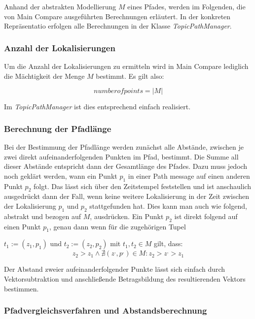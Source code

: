 Anhand der abstrakten Modellierung $M$ eines Pfades, werden im Folgenden, die von
Main Compare ausgeführten Berechnungen erläutert. In der konkreten
Repräsentatio erfolgen alle Berechnungen in der Klasse \textit{TopicPathManager}. 

\subsubsection{Anzahl der Lokalisierungen}
Um die Anzahl der Lokalisierungen zu ermitteln wird in Main Compare lediglich die
Mächtigkeit der Menge $M$ bestimmt. Es gilt also:

\begin{equation*}
  \label{eqn:numofpoints}
  number of points = \vert M \vert
\end{equation*}

Im \textit{TopicPathManager} ist dies entsprechend einfach realisiert.

\subsubsection{Berechnung der Pfadlänge}
Bei der Bestimmung der Pfadlänge werden zunächst alle Abstände, zwischen je
zwei direkt aufeinanderfolgenden Punkten im Pfad, bestimmt. Die Summe all dieser
Abstände entspricht dann der Gesamtlänge des Pfades. Dazu muss jedoch noch
geklärt werden, wann ein Punkt $p_1$ in einer Path message auf einen anderen
Punkt $p_2$ folgt. Das lässt sich über den Zeitstempel feststellen und ist
anschaulich ausgedrückt dann der Fall, wenn keine weitere Lokalisierung in
der Zeit zwischen der Lokalisierung $p_1$ und $p_2$ stattgefunden hat. Dies kann man auch wie
folgend, abstrakt und bezogen auf $M$, ausdrücken.  Ein Punkt $p_2$ ist direkt
folgend auf einen Punkt $p_1$, genau dann wenn für die zugehörigen Tupel

$t_1 := (z_1, p_1)$ und $t_2 := (z_2, p_2)$
mit
$t_1,t_2 \in M$
gilt, dass:
\[
z_2 > z_1 \wedge \nexists (z^{,}, p^{,}) \in M : z_2 > z^{,} > z_1
\]

Der Abstand zweier aufeinanderfolgender Punkte lässt sich einfach durch
Vektorsubtraktion und anschließende Betragsbildung des resultierenden Vektors
bestimmen.

\subsubsection{Pfadvergleichsverfahren und Abstandsberechnung}

